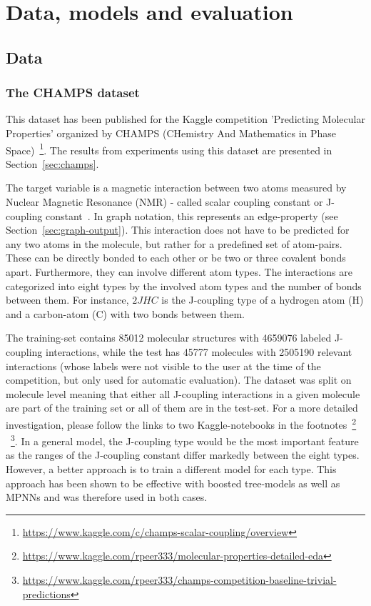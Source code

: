 \chapter{Data, models and evaluation}
\label{chapter:Methods}


\section{Data}
\label{sec:data-and-features}


\subsection{The CHAMPS dataset}
\label{sec:champs-dataset}

This dataset has been published for the Kaggle competition 'Predicting Molecular Properties' organized by CHAMPS (CHemistry And Mathematics in Phase Space)~\footnote{\url{https://www.kaggle.com/c/champs-scalar-coupling/overview}}. The results from experiments using this dataset are presented in Section~\ref{sec:champs}.
	
The target variable is a magnetic interaction between two atoms measured by Nuclear Magnetic Resonance (NMR) - called scalar coupling constant or J-coupling constant~\cite{NMR}.
In graph notation, this represents an edge-property (see Section~\ref{sec:graph-output}). This interaction does not have to be predicted for any two atoms in the molecule, but rather for a predefined set of atom-pairs. These can be directly bonded to each other or be two or three covalent bonds apart. Furthermore, they can involve different atom types. The interactions are categorized into eight types by the involved atom types and the number of bonds between them. For instance, $2JHC$ is the J-coupling type of a hydrogen atom (H) and a carbon-atom (C) with two bonds between them.

The training-set contains 85012 molecular structures with 4659076 labeled J-coupling interactions, while the test has 45777 molecules with 2505190 relevant interactions (whose labels were not visible to the user at the time of the competition, but only used for automatic evaluation). The dataset was split on molecule level meaning that either all J-coupling interactions in a given molecule are part of the training set or all of them are in the test-set. For a more detailed investigation, please follow the links to two Kaggle-notebooks in the footnotes~\footnote{\url{https://www.kaggle.com/rpeer333/molecular-properties-detailed-eda}}
~\footnote{\url{https://www.kaggle.com/rpeer333/champs-competition-baseline-trivial-predictions}}.
In a general model, the J-coupling type would be the most important feature as the ranges of the J-coupling constant differ markedly between the eight types. However, a better approach is to train a different model for each type. This approach has been shown to be effective with boosted tree-models as well as MPNNs and was therefore used in both cases.


